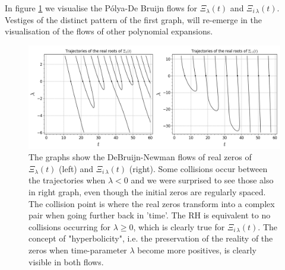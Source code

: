 \documentclass[a4paper,11pt,twoside]{amsart}
\begin{document}
\pagebreak

In figure \ref{fig:poldebruijnflow} we visualise the Pólya-De Bruijn flows for $\Xi_{\lambda}(t)$ and $\Xi_{i\,\lambda}(t)$. Vestiges of the distinct pattern of the first graph, will re-emerge in the visualisation of the flows of other polynomial expansions.

\begin{figure}[H]
  \includegraphics[width=1\linewidth]{PolyaDeBruijnFlowdouble.jpeg}
  \caption{The graphs show the DeBruijn-Newman flows of real zeros of $\Xi_{\lambda}(t)$ (left) and $\Xi_{i\,\lambda}(t)$ (right). Some collisions occur between the trajectories when $\lambda < 0$ and we were surprised to see those also in right graph, even though the initial zeros are regularly spaced. The collision point is where the real zeros transform into a complex pair when going further back in 'time'. The RH is equivalent to no collisions occurring for $\lambda \ge 0$, which is clearly true for $\Xi_{i\,\lambda}(t)$. The concept of "hyperbolicity", i.e. the preservation of the reality of the zeros when time-parameter $\lambda$ become more positives, is clearly visible in both flows.}
  \label{fig:poldebruijnflow}
\end{figure}
\end{document}
